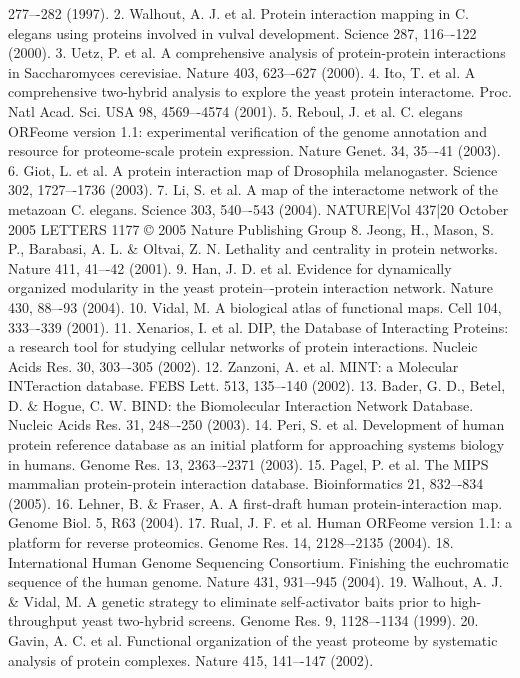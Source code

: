 277–-282 (1997).
2.
Walhout, A. J. et al. Protein interaction mapping in C. elegans using proteins
involved in vulval development. Science 287, 116–-122 (2000).
3.
Uetz, P. et al. A comprehensive analysis of protein-protein interactions in
Saccharomyces cerevisiae. Nature 403, 623–-627 (2000).
4.
Ito, T. et al. A comprehensive two-hybrid analysis to explore the yeast protein
interactome. Proc. Natl Acad. Sci. USA 98, 4569–-4574 (2001).
5.
Reboul, J. et al. C. elegans ORFeome version 1.1: experimental veriﬁcation of the
genome annotation and resource for proteome-scale protein expression.
Nature Genet. 34, 35–-41 (2003).
6.
Giot, L. et al. A protein interaction map of Drosophila melanogaster. Science 302,
1727–-1736 (2003).
7.
Li, S. et al. A map of the interactome network of the metazoan C. elegans.
Science 303, 540–-543 (2004).
NATURE|Vol 437|20 October 2005
LETTERS
1177
© 2005 Nature Publishing Group
8.
Jeong, H., Mason, S. P., Barabasi, A. L. \& Oltvai, Z. N. Lethality and centrality in
protein networks. Nature 411, 41–-42 (2001).
9.
Han, J. D. et al. Evidence for dynamically organized modularity in the yeast
protein–-protein interaction network. Nature 430, 88–-93 (2004).
10. Vidal, M. A biological atlas of functional maps. Cell 104, 333–-339 (2001).
11.
Xenarios, I. et al. DIP, the Database of Interacting Proteins: a research tool for
studying cellular networks of protein interactions. Nucleic Acids Res. 30,
303–-305 (2002).
12.
Zanzoni, A. et al. MINT: a Molecular INTeraction database. FEBS Lett. 513,
135–-140 (2002).
13.
Bader, G. D., Betel, D. \& Hogue, C. W. BIND: the Biomolecular Interaction
Network Database. Nucleic Acids Res. 31, 248–-250 (2003).
14.
Peri, S. et al. Development of human protein reference database as an initial
platform for approaching systems biology in humans. Genome Res. 13,
2363–-2371 (2003).
15.
Pagel, P. et al. The MIPS mammalian protein-protein interaction database.
Bioinformatics 21, 832–-834 (2005).
16.
Lehner, B. \& Fraser, A. A ﬁrst-draft human protein-interaction map. Genome
Biol. 5, R63 (2004).
17.
Rual, J. F. et al. Human ORFeome version 1.1: a platform for reverse proteomics.
Genome Res. 14, 2128–-2135 (2004).
18.
International Human Genome Sequencing Consortium. Finishing the
euchromatic sequence of the human genome. Nature 431, 931–-945 (2004).
19.
Walhout, A. J. \& Vidal, M. A genetic strategy to eliminate self-activator baits
prior to high-throughput yeast two-hybrid screens. Genome Res. 9, 1128–-1134
(1999).
20. Gavin, A. C. et al. Functional organization of the yeast proteome by systematic
analysis of protein complexes. Nature 415, 141–-147 (2002).

